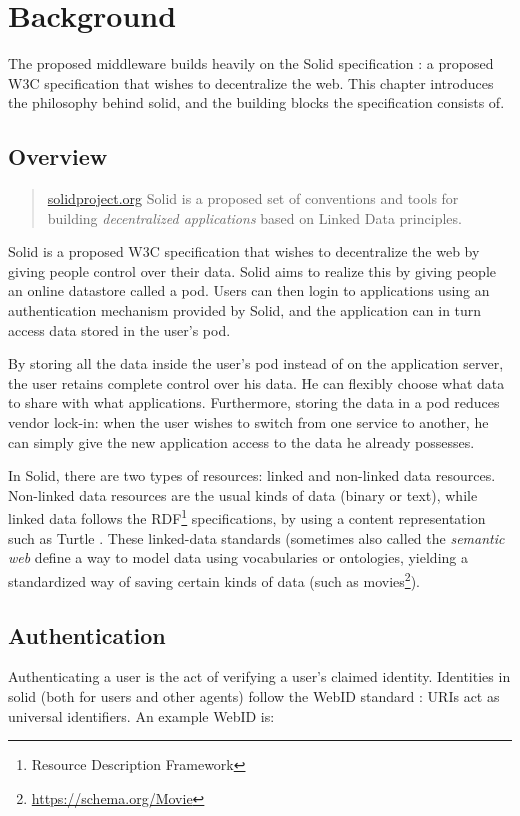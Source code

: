 \chapter{Background}
\label{cha:background}
The proposed middleware builds heavily on the Solid specification \citep{solid}: a proposed W3C specification that wishes to decentralize the web. This chapter introduces the philosophy behind solid, and the building blocks the specification consists of.

\section{Overview}
\begin{quote}{\href{https://solidproject.org}{solidproject.org}}
    Solid is a proposed set of conventions and tools for building \textit{decentralized applications} based on Linked Data principles.
\end{quote}

\noindent Solid is a proposed W3C specification that wishes to decentralize the web by giving people control over their data. Solid aims to realize this by giving people an online datastore called a pod. Users can then login to applications using an authentication mechanism provided by Solid, and the application can in turn access data stored in the user's pod.

By storing all the data inside the user's pod instead of on the application server, the user retains complete control over his data. He can flexibly choose what data to share with what applications. Furthermore, storing the data in a pod reduces vendor lock-in: when the user wishes to switch from one service to another, he can simply give the new application access to the data he already possesses. 

In Solid, there are two types of resources: linked and non-linked data resources. Non-linked data resources are the usual kinds of data (binary or text), while linked data follows the 
 RDF\footnote{Resource Description Framework} specifications, by using a content representation such as Turtle \citep{turtle}. These linked-data standards (sometimes also called the \textit{semantic web} define a way to model data using vocabularies or ontologies, yielding a standardized way of saving certain kinds of data (such as movies\footnote{\url{https://schema.org/Movie}}).

\section{Authentication}
Authenticating a user is the act of verifying a user's claimed identity. Identities in solid (both for users and other agents) follow the WebID standard \citep{webid}: URIs act as universal identifiers. An example WebID is:

